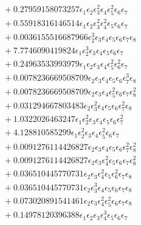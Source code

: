 \documentclass[10pt]{article}
\begin{document}
\begin{align*}
&{}  + 0.27959158073257 \epsilon_{1} \epsilon_{2} \epsilon_{3}^{2} \epsilon_{4} \epsilon_{5}^{2} \epsilon_{6} \epsilon_{7} \\
&{}  + 0.55918316146514 \epsilon_{1} \epsilon_{2} \epsilon_{3}^{2} \epsilon_{4}^{2} \epsilon_{5} \epsilon_{6} \epsilon_{7} \\
&{}  + 0.0036155516687966 \epsilon_{2}^{3} \epsilon_{3} \epsilon_{4} \epsilon_{5} \epsilon_{6} \epsilon_{7} \epsilon_{8} \\
&{}  + 7.7746090419824 \epsilon_{1} \epsilon_{2}^{3} \epsilon_{3} \epsilon_{4} \epsilon_{5} \epsilon_{6} \epsilon_{7} \\
&{}  + 0.24963533993979 \epsilon_{1} \epsilon_{2} \epsilon_{3} \epsilon_{4} \epsilon_{5}^{2} \epsilon_{6}^{2} \epsilon_{7} \\
&{}  + 0.0078236669508709 \epsilon_{2} \epsilon_{3} \epsilon_{4} \epsilon_{5} \epsilon_{6} \epsilon_{7}^{3} \epsilon_{8} \\
&{}  + 0.0078236669508709 \epsilon_{2} \epsilon_{3} \epsilon_{4} \epsilon_{5}^{2} \epsilon_{6} \epsilon_{7} \epsilon_{8}^{2} \\
&{}  + 0.031294667803483 \epsilon_{2} \epsilon_{3}^{2} \epsilon_{4} \epsilon_{5} \epsilon_{6} \epsilon_{7}^{2} \epsilon_{8} \\
&{}  + 1.0322026463247 \epsilon_{1} \epsilon_{2}^{2} \epsilon_{3} \epsilon_{4} \epsilon_{5} \epsilon_{6} \epsilon_{7}^{2} \\
&{}  + 4.128810585299 \epsilon_{1} \epsilon_{2}^{2} \epsilon_{3} \epsilon_{4} \epsilon_{5}^{2} \epsilon_{6} \epsilon_{7} \\
&{}  + 0.0091276114426827 \epsilon_{2} \epsilon_{3} \epsilon_{4} \epsilon_{5} \epsilon_{6} \epsilon_{7}^{2} \epsilon_{8}^{2} \\
&{}  + 0.0091276114426827 \epsilon_{2} \epsilon_{3} \epsilon_{4}^{2} \epsilon_{5} \epsilon_{6} \epsilon_{7} \epsilon_{8}^{2} \\
&{}  + 0.036510445770731 \epsilon_{2} \epsilon_{3} \epsilon_{4}^{2} \epsilon_{5} \epsilon_{6}^{2} \epsilon_{7} \epsilon_{8} \\
&{}  + 0.036510445770731 \epsilon_{2} \epsilon_{3}^{3} \epsilon_{4} \epsilon_{5} \epsilon_{6} \epsilon_{7} \epsilon_{8} \\
&{}  + 0.073020891541461 \epsilon_{2} \epsilon_{3} \epsilon_{4}^{2} \epsilon_{5}^{2} \epsilon_{6} \epsilon_{7} \epsilon_{8} \\
&{}  + 0.14978120396388 \epsilon_{1} \epsilon_{2} \epsilon_{3} \epsilon_{4}^{3} \epsilon_{5} \epsilon_{6} \epsilon_{7} \\

\end{align*}
\end{document}
